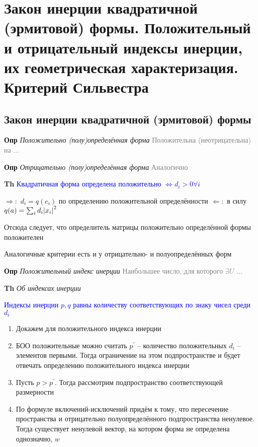 \documentclass[a4paper, 14pt]{article}
\begin{document}
    \section{Закон инерции квадратичной (эрмитовой) формы.
    Положительный и отрицательный индексы инерции, их геометрическая характеризация.
    Критерий Сильвестра}
    
    \subsection{Закон инерции квадратичной (эрмитовой) формы}
    
    \textbf{Опр} \textit{Положительно (полу)определённая форма} \textcolor{gray}{Положительна (неотрицательна) на ...}
    
    \textbf{Опр} \textit{Отрицательно (полу)определённая форма} \textcolor{gray}{Аналогично}
    
    \textbf{Th} \textcolor{blue}{Квадратичная форма определена положительно $\Leftrightarrow d_i > 0 \forall i$}
    
    $\Rightarrow:$ $d_i = q(e_i)$ по определению положительной определённости
    $\Leftarrow:$ в силу $q(a) = \sum_i d_i \abs{x_i}^2$
    
    Отсюда следует, что определитель матрицы положительно определённой формы положителен
    
    Аналогичные критерии есть и у отрицательно- и полуопределённых форм
    
    \textbf{Опр} \textit{Положительный индекс инерции} \textcolor{gray}{Наибольшее число, для которого $\exists U$ ...}
    
    \textbf{Th} \textit{Об индексах инерции}
    
    \textcolor{blue}{Индексы инерции $p, q$ равны количеству соответствующих по знаку чисел среди $d_i$}
    
    \begin{enumerate}
        \item Докажем для положительного индекса инерции
        \item БОО положительные можно считать $p^{'}$ -- количество положительных $d_i$ -- элементов первыми.
        Тогда ограничение на этом подпространстве и будет отвечать определению положительного индекса инерции
        \item Пусть $p > p^{'}$.
        Тогда рассмотрим подпространство соответствующей размерности
        \item По формуле включений-исключений придём к тому, что пересечение пространства и отрицательно
        полуопределённого подпространства ненулевое.
        Тогда существует ненулевой вектор, на котором форма не определена однозначно, $w$
    \end{enumerate}
    
\end{document}

